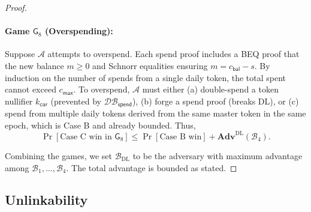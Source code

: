 \documentclass[11pt]{article}
\theoremstyle{definitionstyle}
\theoremstyle{plain}
\newcommand{\advantage}[1]{\mathbf{Adv}^{\mathrm{#1}}}
\newcommand{\DB}{\mathcal{DB}}
\begin{document}
\begin{proof}
\paragraph{Game $\mathsf{G}_8$ (Overspending):} Suppose $\mathcal{A}$ attempts to overspend. Each spend proof includes a BEQ proof that the new balance $m \ge 0$ and Schnorr equalities ensuring $m = c_{\mathsf{bal}} - s$. By induction on the number of spends from a single daily token, the total spent cannot exceed $c_{\mathsf{max}}$. To overspend, $\mathcal{A}$ must either (a) double-spend a token nullifier $k_{\mathsf{cur}}$ (prevented by $\DB_{\mathsf{spend}}$), (b) forge a spend proof (breaks DL), or (c) spend from multiple daily tokens derived from the same master token in the same epoch, which is Case B and already bounded. Thus,
\[
\Pr[\text{Case C win in }\mathsf{G}_8] \le \Pr[\text{Case B win}] + \advantage{DL}(\mathcal{B}_4).
\]

Combining the games, we set $\mathcal{B}_{\text{DL}}$ to be the adversary with maximum advantage among $\mathcal{B}_1,\dots,\mathcal{B}_4$. The total advantage is bounded as stated.
\end{proof}

\subsection{Unlinkability}
\end{document}

